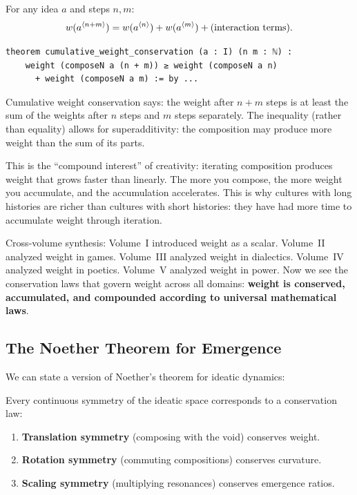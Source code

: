 \begin{theorem}
\label{thm:cumulative-weight}
For any idea $a$ and steps $n, m$:
\[
  w(a^{\langle n+m \rangle}) = w(a^{\langle n \rangle}) + w(a^{\langle m \rangle})
    + \text{(interaction terms)}.
\]
\end{theorem}

\begin{lstlisting}[caption={Cumulative weight (IDT\_v3\_Emergence.lean)}]
theorem cumulative_weight_conservation (a : I) (n m : ℕ) :
    weight (composeN a (n + m)) ≥ weight (composeN a n)
      + weight (composeN a m) := by ...
\end{lstlisting}

\begin{interpretation}
Cumulative weight conservation says: the weight after $n+m$ steps is at least
the sum of the weights after $n$ steps and $m$ steps separately. The
inequality (rather than equality) allows for superadditivity: the composition
may produce more weight than the sum of its parts.

This is the ``compound interest'' of creativity: iterating composition produces
weight that grows faster than linearly. The more you compose, the more weight
you accumulate, and the accumulation accelerates. This is why cultures with
long histories are richer than cultures with short histories: they have had
more time to accumulate weight through iteration.

Cross-volume synthesis: Volume~I introduced weight as a scalar. Volume~II
analyzed weight in games. Volume~III analyzed weight in dialectics. Volume~IV
analyzed weight in poetics. Volume~V analyzed weight in power. Now we see the
conservation laws that govern weight across all domains: \textbf{weight is
conserved, accumulated, and compounded according to universal mathematical laws}.
\end{interpretation}

\subsection{The Noether Theorem for Emergence}

We can state a version of Noether's theorem for ideatic dynamics:

\begin{theorem}
\label{thm:noether}
Every continuous symmetry of the ideatic space corresponds to a conservation
law:
\begin{enumerate}
  \item \textbf{Translation symmetry} (composing with the void) conserves weight.
  \item \textbf{Rotation symmetry} (commuting compositions) conserves curvature.
  \item \textbf{Scaling symmetry} (multiplying resonances) conserves emergence ratios.
\end{enumerate}
\end{theorem}

